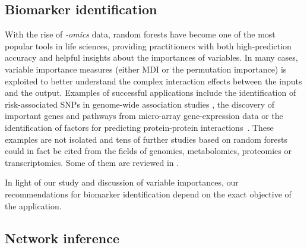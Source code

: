 \subsection{Biomarker identification}

With the rise of \textit{-omics} data, random forests have become one of the
most popular tools in life sciences, providing practitioners with both
high-prediction accuracy and helpful insights about the importances of variables. In
many cases, variable importance measures (either MDI or the permutation
importance) is exploited to better understand the complex interaction effects
between the inputs and the output. Examples of successful applications include
the identification of risk-associated SNPs in genome-wide association studies
\citep{lunetta:2004,meng:2009,botta:2014}, the discovery of important genes and
pathways from micro-array gene-expression data \citep{pang:2006,chang:2008} or
the identification of factors for predicting protein-protein
interactions~\citep{qi:2006}. These examples are not isolated and tens of
further studies based on random forests could in fact be cited from the fields
of genomics, metabolomics, proteomics or transcriptomics. Some of them are
reviewed in \citep{touw:2013,boulesteix:2012}.

In light of our study and discussion of variable importances, our
recommendations for biomarker identification depend on the exact objective
of the application. \todo{}




\subsection{Network inference}
\todo{}

